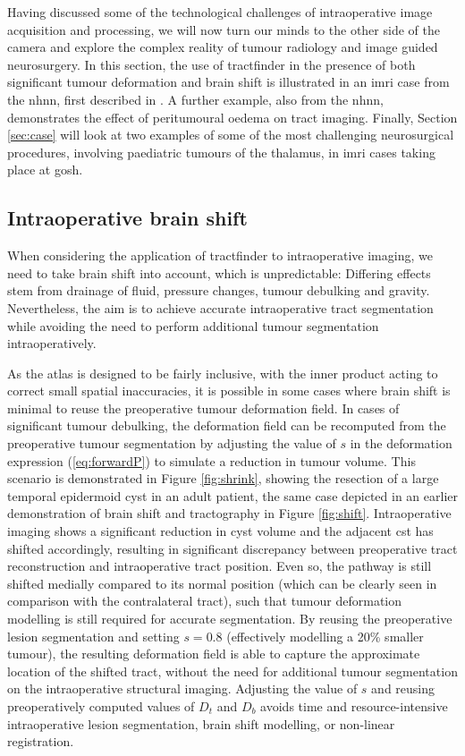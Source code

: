 \documentclass[12pt,phd,a4paper,twoside]{ucl_thesis}
\renewcommand{\textcite}[2][]{
\ifthenelse { \equal {#1} {} }  {\citeauthor{#2}\autocite{#2}}   {\citeauthor{#1}\autocite{#2}}}
\begin{document}
Having discussed some of the technological challenges of intraoperative image acquisition and processing, we will now turn our minds to the other side of the camera and explore the complex reality of tumour radiology and image guided neurosurgery.
In this section, the use of tractfinder in the presence of both significant tumour deformation and brain shift is illustrated in an \gls{imri} case from the \gls{nhnn}, first described in \textcite{Young2022}.
A further example, also from the \gls{nhnn}, demonstrates the effect of peritumoural oedema on tract imaging.
Finally, Section \ref{sec:case} will look at two examples of some of the most challenging neurosurgical procedures, involving paediatric tumours of the thalamus, in \gls{imri} cases taking place at \gls{gosh}.

\subsection{Intraoperative brain shift}
\label{sec:imri}

When considering the application of tractfinder to intraoperative imaging, we need to take brain shift into account, which is unpredictable:
Differing effects stem from drainage of fluid, pressure changes, tumour debulking and gravity.
Nevertheless, the aim is to achieve accurate intraoperative tract segmentation while avoiding the need to perform additional tumour segmentation intraoperatively.

As the atlas is designed to be fairly inclusive, with the inner product acting to correct small spatial inaccuracies, it is possible in some cases where brain shift is minimal to reuse the preoperative tumour deformation field.
In cases of significant tumour debulking, the deformation field can be recomputed from the preoperative tumour segmentation by adjusting the value of $s$ in the deformation expression (\ref{eq:forwardP}) to simulate a reduction in tumour volume.
This scenario is demonstrated in Figure \ref{fig:shrink}, showing the resection of a large temporal epidermoid cyst in an adult patient, the same case depicted in an earlier demonstration of brain shift and tractography in Figure \ref{fig:shift}.
Intraoperative imaging shows a significant reduction in cyst volume and the adjacent \gls{cst} has shifted accordingly, resulting in significant discrepancy between preoperative tract reconstruction and intraoperative tract position.
Even so, the pathway is still shifted medially compared to its normal position (which can be clearly seen in comparison with the contralateral tract), such that tumour deformation modelling is still required for accurate segmentation.
By reusing the preoperative lesion segmentation and setting $s=0.8$ (effectively modelling a 20\% smaller tumour), the resulting deformation field is able to capture the approximate location of the shifted tract, without the need for additional tumour segmentation on the intraoperative structural imaging.
Adjusting the value of $s$ and reusing preoperatively computed values of $D_t$ and $D_b$ avoids time and resource-intensive intraoperative lesion segmentation, brain shift modelling, or non-linear registration.
\end{document}

